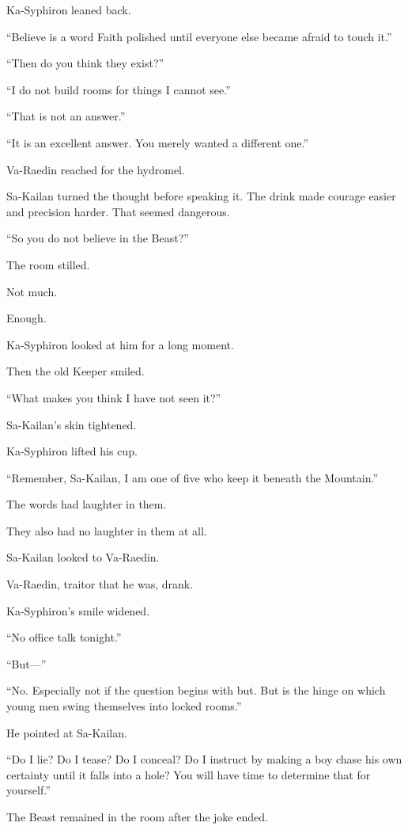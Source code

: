 Ka-Syphiron leaned back.\par
“Believe is a word Faith polished until everyone else became afraid to touch it.”\par
“Then do you think they exist?”\par
“I do not build rooms for things I cannot see.”\par
“That is not an answer.”\par
“It is an excellent answer. You merely wanted a different one.”\par
Va-Raedin reached for the hydromel.\par
Sa-Kailan turned the thought before speaking it. The drink made courage easier and precision harder. That seemed dangerous.\par
“So you do not believe in the Beast?”\par
The room stilled.\par
Not much.\par
Enough.\par
Ka-Syphiron looked at him for a long moment.\par
Then the old Keeper smiled.\par
“What makes you think I have not seen it?”\par
Sa-Kailan’s skin tightened.\par
Ka-Syphiron lifted his cup.\par
“Remember, Sa-Kailan, I am one of five who keep it beneath the Mountain.”\par
The words had laughter in them.\par
They also had no laughter in them at all.\par
Sa-Kailan looked to Va-Raedin.\par
Va-Raedin, traitor that he was, drank.\par
Ka-Syphiron’s smile widened.\par
“No office talk tonight.”\par
“But—”\par
“No. Especially not if the question begins with but. But is the hinge on which young men swing themselves into locked rooms.”\par
He pointed at Sa-Kailan.\par
“Do I lie? Do I tease? Do I conceal? Do I instruct by making a boy chase his own certainty until it falls into a hole? You will have time to determine that for yourself.”\par
The Beast remained in the room after the joke ended.\par
